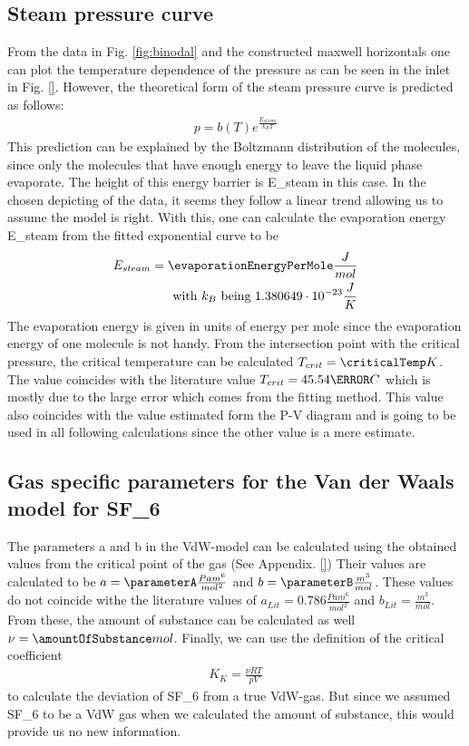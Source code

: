 \documentclass[a4paper,10pt,twocolumn]{article}
\begin{document}
    \subsection{Steam pressure curve}\label{subsec:steamPressureCurve}
    From the data in Fig. \ref{fig:binodal} and the constructed maxwell horizontals one can plot the temperature dependence of the pressure as can be seen in the inlet in Fig. \ref{}.
    However, the theoretical form of the steam pressure curve is predicted as follows:
    \begin{align}
        p=b(T)e^\frac{E_{steam}}{k_B T}
    \end{align}
    This prediction can be explained by the Boltzmann distribution of the molecules, since only the molecules that have enough energy to leave the liquid phase evaporate.
    The height of this energy barrier is E_{steam}\) in this case.
    In the chosen depicting of the data, it seems they follow a linear trend allowing us to assume the model is right.
    With this, one can calculate the evaporation energy E_{steam}\) from the fitted exponential curve to be
    \begin{align}
        E_{steam} = \evaporationEnergyPerMole \frac{J}{mol}
        \endline \text{with } k_B \text{ being } 1.380649\cdot 10^{-23}\frac{J}{K}
    \end{align}
    The evaporation energy is given in units of energy per mole since the evaporation energy of one molecule is not handy. 
    From the intersection point with the critical pressure, the critical temperature can be calculated $T_{crit}=\criticalTemp K$.
    The value coincides with the literature value $T_{crit} = 45.54\degree C$ which is mostly due to the large error which comes from the fitting method.
    This value also coincides with the value estimated form the P-V diagram and is going to be used in all following calculations since the other value is a mere estimate.
    
    \subsection{Gas specific parameters for the Van der Waals model for SF_6\)}\label{subsec:gasSpecParams}
    The parameters a and b in the VdW-model can be calculated using the obtained values from the critical point of the gas (See Appendix. \ref{})
    Their values are calculated to be $a = \parameterA \frac{Pa m^6}{mol^2}$ and $b =\parameterB \frac{m^3}{mol}$.
    These values do not coincide withe the literature values of $a_{Lit} = 0.786 \frac{Pa m^6}{mol^2}$ and $b_{Lit} = \frac{m^3}{mol}$.
    From these, the amount of substance can be calculated as well $\nu = \amountOfSubstance mol$.
    Finally, we can use the definition of the critical coefficient
    \begin{align}\label{eq:critcalCoeff}
        K_K = \frac{\nu RT}{pV}
    \end{align}
    to calculate the deviation of SF_6\) from a true VdW-gas.
    But since we assumed SF_6\) to be a VdW gas when we calculated the amount of substance, this would provide us no new information.
    
\end{document}
